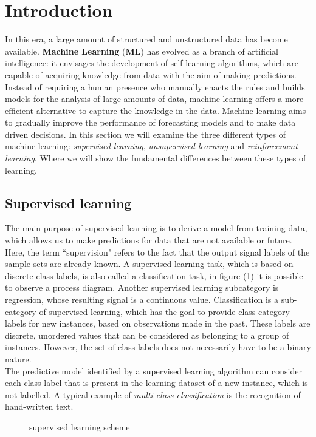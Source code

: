 \section{Introduction}
\label{sec:intro}
In this era, a large amount of structured and unstructured data has become 
available. \textbf{Machine Learning} (\textbf{ML}) has evolved as a branch of
artificial intelligence: it envisages the development of self-learning
algorithms, which are capable of acquiring knowledge from data with the aim of
making predictions. Instead of requiring a human presence who manually enacts
the rules and builds models for the analysis of large amounts of data, machine
learning offers a more efficient alternative to capture the knowledge in the
data. Machine learning aims to gradually improve the performance of forecasting
models and to make data driven decisions. In this section we will examine the
three different types of machine learning: \emph{supervised learning},
\emph{unsupervised learning} and \emph{reinforcement learning}. 
Where we will show the fundamental differences between these types of
learning.\cite{raschka2016machine}
%
\subsection{Supervised learning}
\label{subsec:supervised-learnig}
The main purpose of supervised learning is to derive a model from training data,
which allows us to make predictions for data that are not available or future.
Here, the term ``supervision" refers to the fact that the output signal labels
of the sample sets are already known. A supervised learning task, which is based
on discrete class labels, is also called a classification task, in figure
(\ref{fig:supervised-learning-scheme}) it is possible to observe a process
diagram. Another supervised learning subcategory is regression, whose resulting
signal is a continuous value. Classification is a sub-category of supervised
learning, which has the goal to provide class category labels for new instances,
based on observations made in the past.
These labels are discrete, unordered values that can be considered as belonging
to a group of instances. However, the set of class labels does not necessarily
have to be a binary nature.\\ 
The predictive model identified by a supervised learning algorithm can consider
each class label that is present in the learning dataset of a new instance,
which is not labelled. 
A typical example of \emph{multi-class classification} is the recognition of
hand-written text.\cite{raschka2016machine}
%
\begin{figure}[!h]
\centering
\resizebox{0.65\textwidth}{!}{}
\caption{supervised learning scheme} 
\label{fig:supervised-learning-scheme}
\end{figure}
%
